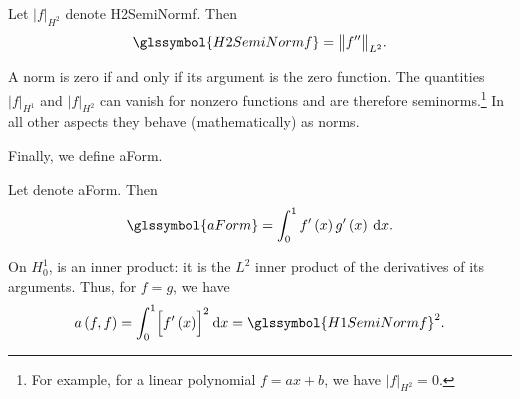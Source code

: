 \begin{definition}	\label{def:H2_Semi_Norm}
	Let $\vert f \vert_{ H^2 }$ denote \gls{H2SemiNormf}. Then
	\begin{equation}	\label{eqn:H2_Semi_Norm}
		\glssymbol{H2SemiNormf} = \big\| f^{ \prime \prime }\big\|_{ L^2 } .
	\end{equation}
\end{definition}
\begin{remark}
	A norm is zero if and only if its argument is the zero function. The quantities $\vert f \vert_{ H^1 }$ and
	$\vert f \vert_{ H^2 }$ can vanish for nonzero functions and are therefore seminorms.\footnote{For example, for a linear
	polynomial $f = ax + b$, we
	have $\vert f \vert_{ H^2 } = 0$.} In all other aspects they behave (mathematically) as norms.
\end{remark}
Finally, we define \gls{aForm}.
\begin{definition}	\label{def:a_Form}
	Let  denote \gls{aForm}. Then
	\begin{equation}	\label{eqn:a_Norm}
		\glssymbol{aForm} = \int_0^1 f^{\prime} \left(x \right) g^{\prime} \left(x \right) \dd x.
	\end{equation}
\end{definition}
\begin{remark}
	On $H_0^1$,  is an inner product: it is the $L^2$ inner product of the derivatives of its arguments.
	Thus, for $f = g$, we have
	\begin{equation}
		a \left( f, f \right) = \int_0^1 \Bigl[ f^{\prime} \left(x \right) \Bigr]^2 \dd x = \glssymbol{H1SemiNormf}^2.
	\end{equation}
\end{remark}
%